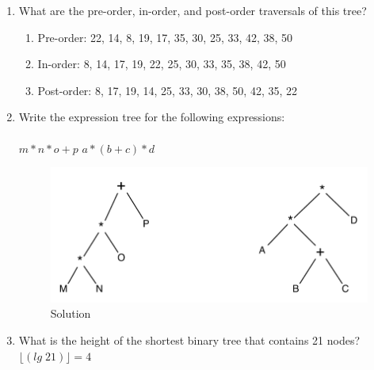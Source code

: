 \documentclass[11pt]{article}
\begin{document}
{\begin{enumerate}
\begin{enumerate}
\item a full binary tree? {\color{red} No, nodes 8 and 19 do not have two children.}

\item a complete binary tree? {\color{red} No, the bottom level is not filled in from left to right.}

\end{enumerate}

\item What are the pre-order, in-order, and post-order traversals of this tree?

\begin{enumerate}

\item Pre-order: {\color{red} 22, 14, 8, 19, 17, 35, 30, 25, 33, 42, 38, 50}

\item In-order: {\color{red} 8, 14, 17, 19, 22, 25, 30, 33, 35, 38, 42, 50}

\item Post-order: {\color{red} 8, 17, 19, 14, 25, 33, 30, 38, 50, 42, 35, 22}

\end{enumerate}

\newpage

\item {Write the expression tree for the following expressions: \\ \\
$m * n * o + p$ \hspace*{3in}$a * (b + c) * d$
}

\begin{figure}[h]
\centerline {
\includegraphics[width=5in]{exp-tree-soln.pdf}
}
{\color{red} \caption{Solution}}
\end{figure}

\item What is the height of the shortest binary tree that contains 21 nodes? {\color{red} $\lfloor (lg \; 21) \rfloor = 4$ }


\end{enumerate}}
\end{document}

